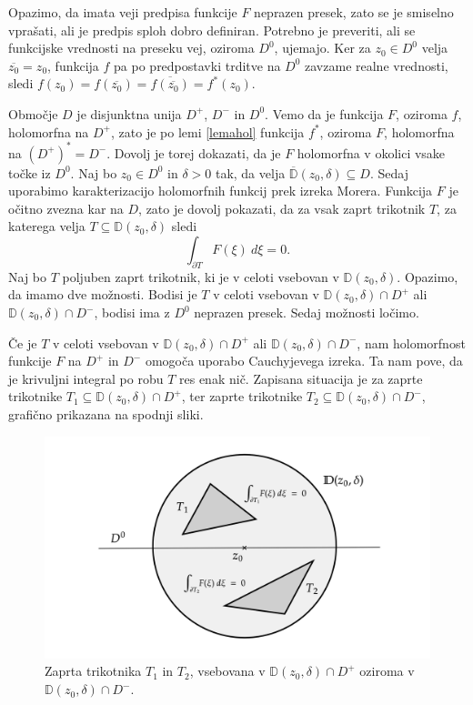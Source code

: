 \documentclass[mat1, tisk]{fmfdelo}
\begin{document}
    \begin{dokaz}
        Opazimo, da imata veji predpisa funkcije $F$ neprazen presek, zato se je smiselno vprašati, ali je predpis sploh dobro definiran. Potrebno je preveriti, ali se funkcijske vrednosti na preseku vej, oziroma $D^0$, ujemajo.  
        Ker za $z_0 \in D^0$ velja $\overline{z_0} = z_0$, funkcija $f$ pa po predpostavki trditve na $D^0$ zavzame realne vrednosti, sledi $f(z_0) = f(\overline{z_0}) = \overline{f(\overline{z_0})} = f^*(z_0)$.
        
        Območje $D$ je disjunktna unija $D^+$, $D^-$ in $D^0$. Vemo da je funkcija $F$, oziroma $f$, holomorfna na $D^+$, zato je po lemi \ref{lemahol} funkcija $f^*$, oziroma $F$, holomorfna na $(D^+)^* = D^-$. 
        Dovolj je torej dokazati, da je $F$ holomorfna v okolici vsake točke iz $D^0$. 
        Naj bo $z_0 \in D^0$ in $\delta > 0$ tak, da velja $\overline{\mathbb{D}}(z_0,\delta) \subseteq D$. Sedaj uporabimo karakterizacijo holomorfnih funkcij prek izreka Morera. 
        Funkcija $F$ je očitno zvezna kar na $D$, zato je dovolj pokazati, da za vsak zaprt trikotnik $T$, za katerega velja $T \subseteq \mathbb{D}(z_0, \delta)$ sledi
        $$ 
            \int_{\partial T}{F(\xi)~d\xi} = 0.
        $$
        Naj bo $T$ poljuben zaprt trikotnik, ki je v celoti vsebovan v $\mathbb{D}(z_0,\delta)$. Opazimo, da imamo dve možnosti.
        Bodisi je $T$ v celoti vsebovan v $\mathbb{D}(z_0,\delta) \cap D^+$ ali $\mathbb{D}(z_0,\delta) \cap D^-$, bodisi ima z $D^0$ neprazen presek. Sedaj možnosti ločimo.
        
        Če je $T$ v celoti vsebovan v $\mathbb{D}(z_0,\delta) \cap D^+$ ali $\mathbb{D}(z_0,\delta) \cap D^-$, nam holomorfnost funkcije $F$ na $D^+$ in $D^-$ omogoča uporabo Cauchyjevega izreka. 
        Ta nam pove, da je krivuljni integral po robu $T$ res enak nič. 
        Zapisana situacija je za zaprte trikotnike $T_1 \subseteq \mathbb{D}(z_0,\delta) \cap D^+$, ter zaprte trikotnike $T_2 \subseteq \mathbb{D}(z_0,\delta) \cap D^-$, grafično prikazana na spodnji sliki. 
        \begin{figure}[H]
            \begin{center}
                \includegraphics[width = 0.9 \textwidth]{schwarz_hol_1.png}
                \caption{Zaprta trikotnika $T_1$ in $T_2$, vsebovana v $\mathbb{D}(z_0,\delta) \cap D^+$ oziroma v $\mathbb{D}(z_0,\delta) \cap D^-$.}
            \end{center}    
        \end{figure}


\end{dokaz}
\end{document}
